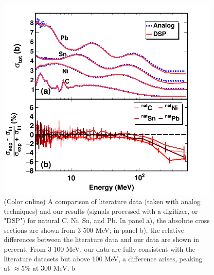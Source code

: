 \documentclass[twocolumn,secnumarabic,amssymb, nobibnotes, aps, prl,
superscriptaddress, nobalancelastpage]{revtex4}
\begin{document}
\begin{figure}
    \includegraphics[scale=0.5]{figures/literatureBenchmarking.png}
    \caption{(Color online) A comparison of literature data (taken with analog
    techniques) and our results (signals processed with a digitizer, or "DSP")
    for natural C, Ni, Sn, and Pb. In panel a), the absolute cross sections are shown from
    3-500 MeV; in panel b), the relative differences between the literature data and
    our data are shown in percent. From 3-100 MeV, our data are fully consistent with the
    literature datasets but above 100 MeV, a difference arises, peaking at
    $\approx$5\% at 300 MeV.
b}
    \label{LiteratureBenchmarking}
\end{figure}
\end{document}
